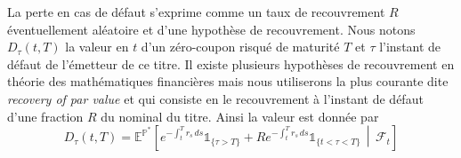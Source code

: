 La perte en cas de défaut s'exprime comme un taux de recouvrement $R$ éventuellement aléatoire et d'une hypothèse de
recouvrement. Nous notons $D_\tau(t,T)$ la valeur en $t$ d'un zéro-coupon risqué de maturité $T$ et $\tau$ l'instant de
défaut de l'émetteur de ce titre. Il existe plusieurs hypothèses de recouvrement en théorie des mathématiques financières
mais nous utiliserons la plus courante dite \emph{recovery of par value} et qui consiste en le recouvrement
à l'instant de défaut d'une fraction $R$ du nominal du titre. Ainsi la valeur est donnée par
\begin{equation}
    D_{\tau}(t,T) = \mathbb{E}^{\mathbb{P}^*}\!\left[ e^{- \int_t^T r_s \, ds} \mathbb{1}_{\{ \tau > T \}} + Re^{- \int_t^T r_s \, ds} \mathbb{1}_{\{ t < \tau < T \}}\,\middle|\, \mathcal{F}_t \right]
\end{equation}

